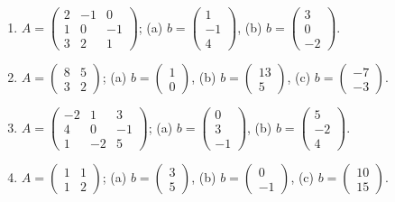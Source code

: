 \begin{enumerate}[label=\arabic*., leftmargin=*]
\item $A=\begin{pmatrix}2&-1&0\\1&0&-1\\3&2&1\end{pmatrix}$; \quad
(a) $b=\begin{pmatrix}1\\-1\\4\end{pmatrix}$, \quad
(b) $b=\begin{pmatrix}3\\0\\-2\end{pmatrix}$.

\item $A=\begin{pmatrix}8&5\\3&2\end{pmatrix}$; \quad
(a) $b=\begin{pmatrix}1\\0\end{pmatrix}$, \quad
(b) $b=\begin{pmatrix}13\\5\end{pmatrix}$, \quad
(c) $b=\begin{pmatrix}-7\\-3\end{pmatrix}$.

\item $A=\begin{pmatrix}-2&1&3\\4&0&-1\\1&-2&5\end{pmatrix}$; \quad
(a) $b=\begin{pmatrix}0\\3\\-1\end{pmatrix}$, \quad
(b) $b=\begin{pmatrix}5\\-2\\4\end{pmatrix}$.

\item $A=\begin{pmatrix}1&1\\1&2\end{pmatrix}$; \quad
(a) $b=\begin{pmatrix}3\\5\end{pmatrix}$, \quad
(b) $b=\begin{pmatrix}0\\-1\end{pmatrix}$, \quad
(c) $b=\begin{pmatrix}10\\15\end{pmatrix}$.


\end{enumerate}
